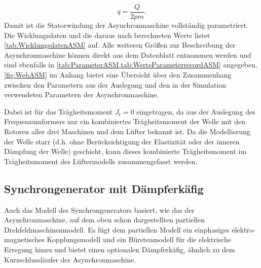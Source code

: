 \begin{equation}
    q = \frac{Q}{2pm}\label{eq:Lochzahl}.
\end{equation}
Damit ist die Statorwindung der Asynchronmaschine vollständig parametriert. Die Wicklungsdaten und die daraus nach  berechneten Werte listet \cref{tab:WicklungsdatenASM} auf. Alle weiteren Größen zur Beschreibung der Asynchronmaschine können direkt aus dem Datenblatt entnommen werden und sind ebenfalls in \cref{tab:ParameterASM,tab:WerteParameterrecordASM} angegeben. \cref{fig:WebASM} im Anhang bietet eine Übersicht über den Zusammenhang zwischen den Parametern aus der Auslegung und den in der Simulation verwendeten Parametern der Asynchronmaschine.

Dabei ist für das Trägheitsmoment \(J_{\mathrm{r}}=0\) eingetragen, da aus der Auslegung des Frequenzumformers nur ein kombiniertes Trägheitsmoment der Welle mit den Rotoren aller drei Maschinen und dem Lüfter bekannt ist. Da die Modellierung der Welle starr (d.h. ohne Berücksichtigung der Elastizität oder der inneren Dämpfung der Welle) geschieht, kann dieses kombinierte Trägheitsmoment im Trägheitsmoment des Lüftermodells zusammengefasst werden.

\subsection{Synchrongenerator mit Dämpferkäfig}\label{sec:synchrongenerator}

Auch das Modell des Synchrongenerators basiert, wie das der Asynchronmaschine, auf dem oben schon dargestellten partiellen Drehfeldmaschinenmodell. Es fügt dem partiellen Modell ein einphasiges elektro-magnetisches Kopplungsmodell und ein Bürstenmodell für die elektrische Erregung hinzu und bietet einen optionalen Dämpferkäfig, ähnlich zu dem Kurzschlussläufer der Asynchronmaschine.

